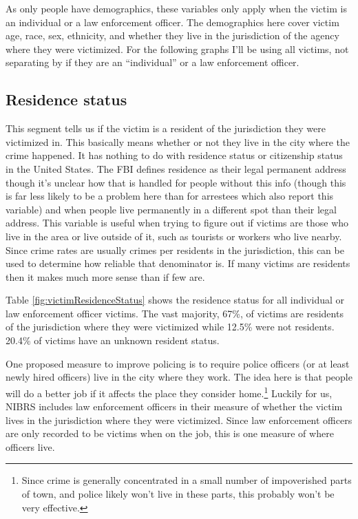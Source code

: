 \documentclass[
]{krantz}
\begin{document}
As only people have demographics, these variables only apply
when the victim is an individual or a law enforcement
officer. The demographics here cover victim age, race, sex,
ethnicity, and whether they live in the jurisdiction of the
agency where they were victimized. For the following graphs
I'll be using all victims, not separating by if they are an
``individual'' or a law enforcement officer.

\subsection{Residence status}\label{residence-status}

This segment tells us if the victim is a resident of the
jurisdiction they were victimized in. This basically means
whether or not they live in the city where the crime
happened. It has nothing to do with residence status or
citizenship status in the United States. The FBI defines
residence as their legal permanent address though it's
unclear how that is handled for people without this info
(though this is far less likely to be a problem here than
for arrestees which also report this variable) and when
people live permanently in a different spot than their legal
address. This variable is useful when trying to figure out
if victims are those who live in the area or live outside of
it, such as tourists or workers who live nearby. Since crime
rates are usually crimes per residents in the jurisdiction,
this can be used to determine how reliable that denominator
is. If many victims are residents then it makes much more
sense than if few are.

Table \ref{fig:victimResidenceStatus} shows the residence
status for all individual or law enforcement officer
victims. The vast majority, 67\%, of victims are residents
of the jurisdiction where they were victimized while 12.5\%
were not residents. 20.4\% of victims have an unknown
resident status.

One proposed measure to improve policing is to require
police officers (or at least newly hired officers) live in
the city where they work. The idea here is that people will
do a better job if it affects the place they consider
home.\footnote{Since crime is generally concentrated in a
  small number of impoverished parts of town, and police
  likely won't live in these parts, this probably won't be
  very effective.} Luckily for us, NIBRS includes law
enforcement officers in their measure of whether the victim
lives in the jurisdiction where they were victimized. Since
law enforcement officers are only recorded to be victims
when on the job, this is one measure of where officers live.
\end{document}
